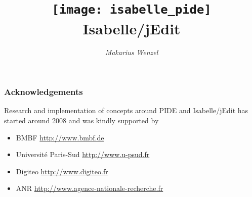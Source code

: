 \documentclass[12pt,a4paper]{report}
\title{\texttt{[image: isabelle\_pide]} \\[4ex] Isabelle/jEdit}
\author{\emph{Makarius Wenzel}}
\begin{document}
\maketitle


\subsubsection*{Acknowledgements}

Research and implementation of concepts around PIDE and Isabelle/jEdit has
started around 2008 and was kindly supported by
\begin{itemize}
\item BMBF \url{http://www.bmbf.de}
\item Universit\'e Paris-Sud \url{http://www.u-psud.fr}
\item Digiteo \url{http://www.digiteo.fr}
\item ANR \url{http://www.agence-nationale-recherche.fr}
\end{itemize}


 \tableofcontents \clearfirst



\begingroup
  \tocentry{\bibname}
   \small\raggedright\frenchspacing
  
\endgroup

\tocentry{\indexname}
\printindex
\end{document}
